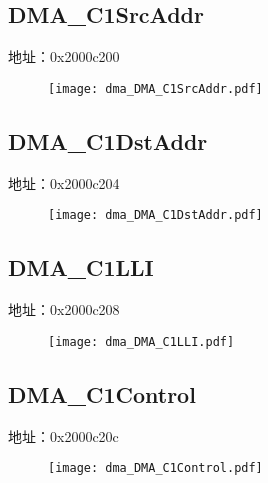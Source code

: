 \subsection{DMA\_C1SrcAddr}
\label{dma-DMA-C1SrcAddr}
地址：0x2000c200
 \begin{figure}[H]
\texttt{[image: dma\_DMA\_C1SrcAddr.pdf]}
\end{figure}

\subsection{DMA\_C1DstAddr}
\label{dma-DMA-C1DstAddr}
地址：0x2000c204
 \begin{figure}[H]
\texttt{[image: dma\_DMA\_C1DstAddr.pdf]}
\end{figure}

\subsection{DMA\_C1LLI}
\label{dma-DMA-C1LLI}
地址：0x2000c208
 \begin{figure}[H]
\texttt{[image: dma\_DMA\_C1LLI.pdf]}
\end{figure}

\subsection{DMA\_C1Control}
\label{dma-DMA-C1Control}
地址：0x2000c20c
 \begin{figure}[H]
\texttt{[image: dma\_DMA\_C1Control.pdf]}
\end{figure}

